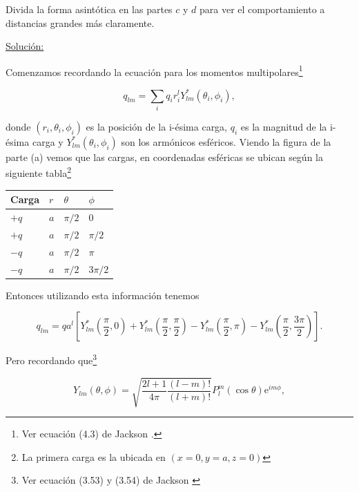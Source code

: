 \documentclass[a4paper,11pt]{article}
\numberwithin{equation}{section}
\newcommand{\euler}{\mathrm{e}}
\begin{document}
Divida la forma asintótica en las partes $c$ y $d$ para ver el comportamiento a 
distancias grandes más claramente.

\vspace{.3cm}

\underline{Solución:} \vspace{.3cm}

Comenzamos recordando la ecuación para los momentos multipolares\footnote{Ver ecuación 
(4.3) de Jackson \cite{jackson}.}

\begin{equation}
 q_{lm} = \sum_i q_ir_i^l Y^*_{lm}(\theta_i,\phi_i),
\end{equation}

donde $(r_i,\theta_i,\phi_i)$ es la posición de la i-ésima carga, $q_i$ es la 
magnitud de la i-ésima carga y $Y^*_{lm}(\theta_i,\phi_i)$ son los armónicos 
esféricos. Viendo la figura de la parte (a) vemos que las cargas, en coordenadas 
esféricas se ubican según la siguiente tabla\footnote{La primera carga es la ubicada 
en $(x=0,y=a,z=0)$}

\begin{table}[H]
\centering
\begin{tabular}{|l|l|l|l|}
\hline
Carga & $r$ & $\theta$ & $\phi$   \\ \hline
$+q$    & $a$ & $\pi/2$  & 0      \\ \hline
$+q$    & $a$ & $\pi/2$  & $\pi/2$  \\ \hline
$-q$    & $a$ & $\pi/2$  & $\pi$    \\ \hline
$-q$    & $a$ & $\pi/2$  & $3\pi/2$ \\ \hline
\end{tabular}
\end{table}

Entonces utilizando esta información tenemos 

\begin{equation}
 q_{lm} = qa^l\left[Y^*_{lm}\left(\frac{\pi}{2},0\right) + 
 Y^*_{lm}\left(\frac{\pi}{2},\frac{\pi}{2}\right) - 
 Y^*_{lm}\left(\frac{\pi}{2},\pi\right) - 
 Y^*_{lm}\left(\frac{\pi}{2},\frac{3\pi}{2}\right)\right].
\end{equation}

Pero recordando que\footnote{Ver ecuación (3.53) y (3.54) de Jackson \cite{jackson}}

\begin{equation}
 Y_{lm}(\theta,\phi) = \sqrt{\frac{2l+1}{4\pi}\frac{(l-m)!}{(l+m)!}}P_l^m(\cos{\theta}) 
 \euler^{im\phi},
 \label{eq:esfericosArmonicosLegendre}
\end{equation}
\end{document}
